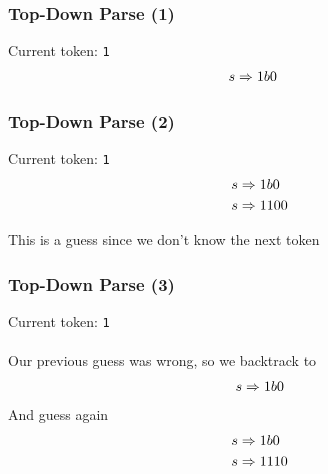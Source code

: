 \documentclass[aspectratio=169]{beamer}
\begin{document}
\begin{frame}
\frametitle{Top-Down Parse (1)}

Current token: \lstinline{1}
\begin{align*}
s &\Rightarrow \text{\lstinline{1}} b \text{\lstinline{0}}
\end{align*}
\end{frame}

\begin{frame}
\frametitle{Top-Down Parse (2)}

Current token: \lstinline{1}
\begin{align*}
s &\Rightarrow \text{\lstinline{1}} b \text{\lstinline{0}}\\
s &\Rightarrow \text{\lstinline{1}} \text{\lstinline{1}} \text{\lstinline{0}}
               \text{\lstinline{0}}
\end{align*}

This is a guess since we don't know the next token
\end{frame}

\begin{frame}
\frametitle{Top-Down Parse (3)}

Current token: \lstinline{1}\\~\\

Our previous guess was wrong, so we backtrack to
\begin{align*}
s &\Rightarrow \text{\lstinline{1}} b \text{\lstinline{0}}\\
\end{align*}
And guess again
\begin{align*}
s &\Rightarrow \text{\lstinline{1}} b \text{\lstinline{0}}\\
s &\Rightarrow \text{\lstinline{1}} \text{\lstinline{1}} \text{\lstinline{1}}
               \text{\lstinline{0}}
\end{align*}
\end{frame}
\end{document}
